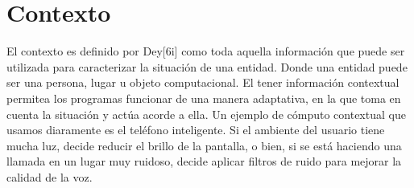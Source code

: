 \documentclass[letterpaper,12pt]{cicese}
\begin{document}
			\section{Contexto}
				El contexto es definido por Dey[6i] como toda aquella informaci\'on que puede ser utilizada para caracterizar la situaci\'on de una entidad. Donde una
				entidad puede ser una persona, lugar u objeto computacional. El tener informaci\'on contextual permitea  los programas funcionar de una manera adaptativa,
				en la que toma en cuenta la situaci\'on y act\'ua acorde a ella. Un ejemplo de c\'omputo contextual que usamos diaramente es el tel\'efono inteligente.
				Si el ambiente del usuario tiene mucha luz, decide reducir el brillo de la pantalla, o bien, si se est\'a haciendo una llamada en un lugar muy ruidoso,
				decide aplicar filtros de ruido para mejorar la calidad de la voz.
		
\end{document}
